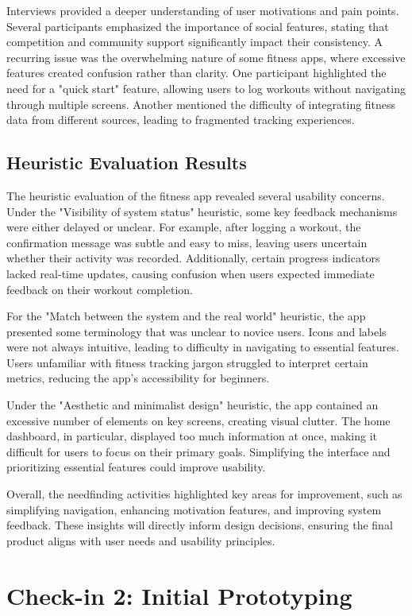 \documentclass[
	letterpaper, %
]{jdf}
\begin{document}
Interviews provided a deeper understanding of user motivations and pain points. Several participants emphasized the importance of social features, stating that competition and community support significantly impact their consistency. A recurring issue was the overwhelming nature of some fitness apps, where excessive features created confusion rather than clarity. One participant highlighted the need for a "quick start" feature, allowing users to log workouts without navigating through multiple screens. Another mentioned the difficulty of integrating fitness data from different sources, leading to fragmented tracking experiences.

\subsection {Heuristic Evaluation Results}
The heuristic evaluation of the fitness app revealed several usability concerns. Under the "Visibility of system status" heuristic, some key feedback mechanisms were either delayed or unclear. For example, after logging a workout, the confirmation message was subtle and easy to miss, leaving users uncertain whether their activity was recorded. Additionally, certain progress indicators lacked real-time updates, causing confusion when users expected immediate feedback on their workout completion.

For the "Match between the system and the real world" heuristic, the app presented some terminology that was unclear to novice users. Icons and labels were not always intuitive, leading to difficulty in navigating to essential features. Users unfamiliar with fitness tracking jargon struggled to interpret certain metrics, reducing the app’s accessibility for beginners.

Under the "Aesthetic and minimalist design" heuristic, the app contained an excessive number of elements on key screens, creating visual clutter. The home dashboard, in particular, displayed too much information at once, making it difficult for users to focus on their primary goals. Simplifying the interface and prioritizing essential features could improve usability.

Overall, the needfinding activities highlighted key areas for improvement, such as simplifying navigation, enhancing motivation features, and improving system feedback. These insights will directly inform design decisions, ensuring the final product aligns with user needs and usability principles.
\newpage

\section{Check-in 2: Initial Prototyping}
\end{document}
